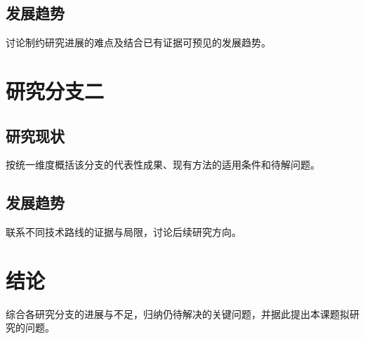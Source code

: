 \section{发展趋势}
讨论制约研究进展的难点及结合已有证据可预见的发展趋势。

\chapter{研究分支二}

\section{研究现状}
按统一维度概括该分支的代表性成果、现有方法的适用条件和待解问题。

\section{发展趋势}
联系不同技术路线的证据与局限，讨论后续研究方向。

\chapter{结论}
综合各研究分支的进展与不足，归纳仍待解决的关键问题，并据此提出本课题拟研究的问题。
